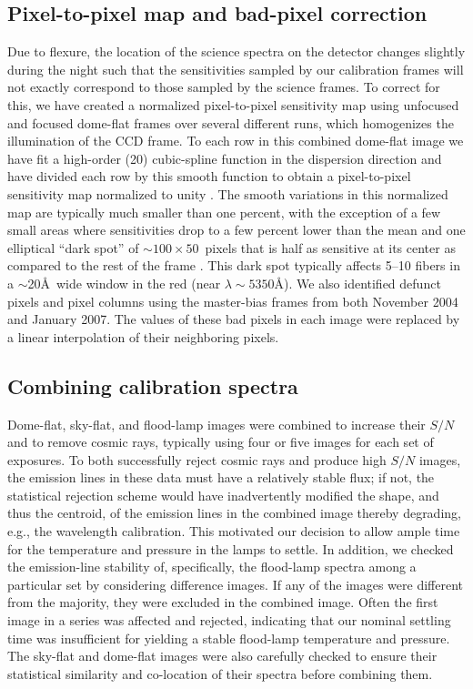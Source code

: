 \documentclass[traditabstract]{aa} %
\begin{document}
\subsection{Pixel-to-pixel map and bad-pixel correction}
\label{sec:P2P}

Due to flexure, the location of the science spectra on the detector changes
slightly during the night such that the sensitivities sampled by our calibration
frames will not exactly correspond to those sampled by the science frames.  To
correct for this, we have created a normalized pixel-to-pixel sensitivity map
using unfocused and focused dome-flat frames over several different runs, which
homogenizes the illumination of the CCD frame.  To each row in this combined
dome-flat image we have fit a high-order (20) cubic-spline function in the
dispersion direction and have divided each row by this smooth function to obtain
a pixel-to-pixel sensitivity map normalized to unity \citep[see Figure~2.6
from][]{martinsson2011}.  The smooth variations in this normalized map are
typically much smaller than one percent, with the exception of a few small areas
where sensitivities drop to a few percent lower than the mean and one elliptical
``dark spot'' of $\sim100\times50$~pixels that is half as sensitive at its
center as compared to the rest of the frame \citep{martinsson2011}. This dark
spot typically affects 5--10 fibers in a $\sim$20\AA\ wide window in the red
(near $\lambda\sim5350$\AA).  We also identified defunct pixels and pixel
columns using the master-bias frames from both November 2004 and January 2007.
The values of these bad pixels in each image were replaced by a linear
interpolation of their neighboring pixels.

\subsection{Combining calibration spectra}

Dome-flat, sky-flat, and flood-lamp images were combined to increase their $S/N$
and to remove cosmic rays, typically using four or five images for each set of
exposures.  To both successfully reject cosmic rays and produce high $S/N$
images, the emission lines in these data must have a relatively stable flux; if
not, the statistical rejection scheme would have inadvertently modified the
shape, and thus the centroid, of the emission lines in the combined image
thereby degrading, e.g., the wavelength calibration.  This motivated our
decision to allow ample time for the temperature and pressure in the lamps to
settle.  In addition, we checked the emission-line stability of, specifically,
the flood-lamp spectra among a particular set by considering difference images.
If any of the images were different from the majority, they were excluded in the
combined image.  Often the first image in a series was affected and rejected,
indicating that our nominal settling time was insufficient for yielding a stable
flood-lamp temperature and pressure.  The sky-flat and dome-flat images were
also carefully checked to ensure their statistical similarity and co-location of
their spectra before combining them.
\end{document}

